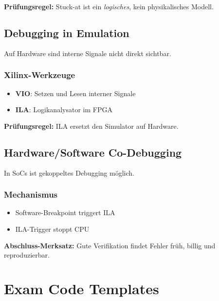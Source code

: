 \documentclass[11pt,a4paper]{article}
\newcommand{\hilite}[1]{\colorbox{yellow!25}{#1}}
\newcommand{\imp}[1]{\textbf{\textcolor{codeemph}{#1}}}
\begin{document}
\imp{Prüfungsregel:}  
\hilite{Stuck-at} ist ein \emph{logisches}, kein \hilite{physikalisches} \hilite{Modell}.

\subsection{Debugging in Emulation}
Auf Hardware sind interne Signale nicht direkt sichtbar.

\subsubsection*{Xilinx-Werkzeuge}
\begin{itemize}
  \item \textbf{VIO}: Setzen und Lesen interner Signale
  \item \textbf{ILA}: Logikanalysator im FPGA
\end{itemize}

\imp{Prüfungsregel:}  
\hilite{ILA} \hilite{ersetzt} den \hilite{Simulator} auf Hardware.

\subsection{Hardware/Software Co-Debugging}
In SoCs ist gekoppeltes Debugging möglich.

\subsubsection*{Mechanismus}
\begin{itemize}
  \item Software-Breakpoint triggert ILA
  \item ILA-Trigger stoppt CPU
\end{itemize}

\imp{Abschluss-Merksatz:}  
\hilite{Gute} \hilite{Verifikation} \hilite{findet} Fehler früh, billig und reproduzierbar.

\section{Exam Code Templates}
\end{document}
